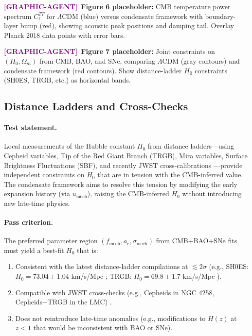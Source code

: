 \documentclass[11pt,a4paper]{article}
\newcommand{\ac}{a_{\mathrm{c}}}
\newcommand{\sigmamech}{\sigma_{\mathrm{mech}}}
\newcommand{\fmech}{f_{\mathrm{mech}}}
\newcommand{\umech}{u_{\mathrm{mech}}}
\theoremstyle{definition}
\newcommand{\GRAPHAGENT}{\textcolor{purple}{\textbf{[GRAPHIC-AGENT]}}}
\begin{document}
\GRAPHAGENT~\textbf{Figure 6 placeholder:} CMB temperature power spectrum $C_\ell^{TT}$ for $\Lambda$CDM (blue) versus condensate framework with boundary-layer bump (red), showing acoustic peak positions and damping tail. Overlay Planck 2018 data points with error bars.

\GRAPHAGENT~\textbf{Figure 7 placeholder:} Joint constraints on $(H_0, \Omega_m)$ from CMB, BAO, and SNe, comparing $\Lambda$CDM (gray contours) and condensate framework (red contours). Show distance-ladder $H_0$ constraints (SH0ES, TRGB, etc.) as horizontal bands.

\subsection{Distance Ladders and Cross-Checks}
\label{sec:distance_ladders}

\paragraph{Test statement.}
Local measurements of the Hubble constant $H_0$ from distance ladders---using Cepheid variables, Tip of the Red Giant Branch (TRGB), Mira variables, Surface Brightness Fluctuations (SBF), and recently JWST cross-calibrations \cite{RiessReview2024,FreedmanTRGB2020}---provide independent constraints on $H_0$ that are in tension with the CMB-inferred value. The condensate framework aims to resolve this tension by modifying the early expansion history (via $\umech$), raising the CMB-inferred $H_0$ without introducing new late-time physics.

\paragraph{Pass criterion.}
The preferred parameter region $(\fmech, \ac, \sigmamech)$ from CMB+BAO+SNe fits must yield a best-fit $H_0$ that is:
\begin{enumerate}[leftmargin=2.2em]
  \item Consistent with the latest distance-ladder compilations at $\lesssim 2\sigma$ (e.g., SH0ES: $H_0 = 73.04 \pm 1.04$ km/s/Mpc \cite{Riess2022}; TRGB: $H_0 = 69.8 \pm 1.7$ km/s/Mpc \cite{FreedmanTRGB2020}).
  \item Compatible with JWST cross-checks (e.g., Cepheids in NGC 4258, Cepheids+TRGB in the LMC) \cite{JWST_Cepheids2023}.
  \item Does not reintroduce late-time anomalies (e.g., modifications to $H(z)$ at $z < 1$ that would be inconsistent with BAO or SNe).
\end{enumerate}
\end{document}

